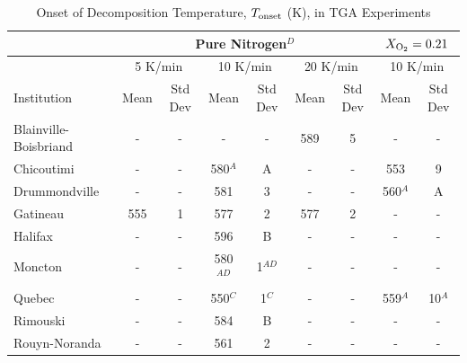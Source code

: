 \documentclass{book}
\begin{document}
\begin{table}[p]
\caption{Onset of Decomposition Temperature, $T_{\rm onset}$ (K), in TGA Experiments}
\label{Table_10}
\begin{center}
\begin{tabular}{|l|cc|cc|cc|cc|}
\hline
                        & \multicolumn{6}{|c|}{Pure Nitrogen$^D$} & \multicolumn{2}{|c|}{$X_{\rm O_2}=0.21$}                                                       \\  \hline
                        & \multicolumn{2}{|c|}{5 K/min} & \multicolumn{2}{|c|}{10 K/min}    & \multicolumn{2}{|c|}{20 K/min} & \multicolumn{2}{|c|}{10 K/min}      \\  \hline
Institution             & Mean        & Std Dev         & Mean           & Std Dev          & Mean       & Std Dev           & Mean        & Std Dev               \\  \hline
Blainville-Boisbriand   & -           & -               & -              & -                & 589        & 5                 & -           & -                     \\
Chicoutimi              & -           & -               & 580$^A$        & A                & -          & -                 & 553         & 9                     \\
Drummondville           & -           & -               & 581            & 3                & -          & -                 & 560$^A$     & A                     \\
Gatineau                & 555         & 1               & 577            & 2                & 577        & 2                 & -           & -                     \\
Halifax                 & -           & -               & 596            & B                & -          & -                 & -           & -                     \\
Moncton                 & -           & -               & 580$^{AD}$     & 1$^{AD}$         & -          & -                 & -           & -                     \\
Quebec                  & -           & -               & 550$^C$        & 1$^C$            & -          & -                 & 559$^A$     & 10$^A$                \\
Rimouski                & -           & -               & 584            & B                & -          & -                 & -           & -                     \\
Rouyn-Noranda           & -           & -               & 561            & 2                & -          & -                 & -           & -                     \\

\end{tabular}
\end{center}
\end{table}
\end{document}
